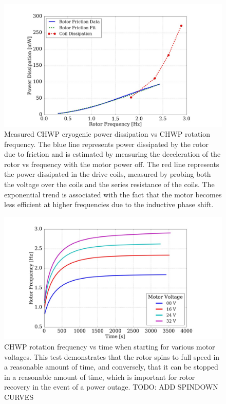 \begin{figure}
    \centering
    \includegraphics[width=0.98\linewidth]{CHWPEvaluation/Figures/chwp_power_dissipation.jpg}
    \caption[CHWP cryogenic power dissipation]{Measured CHWP cryogenic power dissipation vs CHWP rotation frequency. The blue line represents power dissipated by the rotor due to friction and is estimated by measuring the deceleration of the rotor vs frequency with the motor power off. The red line represents the power dissipated in the drive coils, measured by probing both the voltage over the coils and the series resistance of the coils. The exponential trend is associated with the fact that the motor becomes less efficient at higher frequencies due to the inductive phase shift.}
    \label{fig:chwp_power_dissipation}
\end{figure}

\begin{figure}
    \centering
    \includegraphics[width=0.98\linewidth]{CHWPEvaluation/Figures/chwp_startup_curves.jpg}
    \caption[CHWP rotation frequency vs time when starting for various motor voltages]{CHWP rotation frequency vs time when starting for various motor voltages. This test demonstrates that the rotor spins to full speed in a reasonable amount of time, and conversely, that it can be stopped in a reasonable amount of time, which is important for rotor recovery in the event of a power outage. TODO: ADD SPINDOWN CURVES}
    \label{fig:chwp_spinup_curves}
\end{figure}